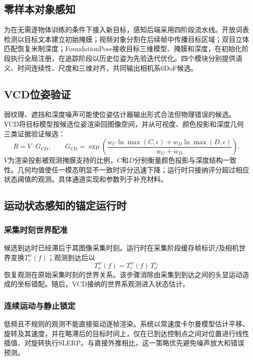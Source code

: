 \documentclass[10pt,journal,compsoc]{IEEEtran}
\begin{document}
\subsection{零样本对象感知}
为在无需逐物体训练的条件下接入新目标，感知后端采用四阶段流水线。开放词表检测以目标文本建立初始掩膜；视频对象分割在后续帧中传播目标区域；双目立体匹配恢复米制深度；FoundationPose接收目标三维模型、掩膜和深度，在初始化阶段执行全局注册，在追踪阶段以历史位姿为先验迭代优化。四个模块分别提供语义、时间连续性、尺度和三维对齐，共同输出相机系6DoF候选。

\subsection{VCD位姿验证}
弱纹理、遮挡和深度噪声可能使位姿估计器输出形式合法但物理错误的候选。VCD将目标模型按候选位姿渲染回图像空间，并从可视度、颜色投影和深度几何三类证据验证候选：
\begin{equation}
R=V\cdot G_{\mathrm{CD}},\qquad
G_{\mathrm{CD}}=\exp\!\left(\frac{w_C\ln\max(C,\epsilon)+w_D\ln\max(D,\epsilon)}{w_C+w_D}\right).
\end{equation}
$V$为渲染投影被观测掩膜支持的比例，$C$和$D$分别衡量颜色投影与深度结构一致性。几何均值使任一模态明显不一致时评分迅速下降；运行时只接纳评分超过相应状态阈值的观测。具体通道实现和参数列于补充材料。

\subsection{运动状态感知的锚定运行时}
\subsubsection{采集时刻世界配准}
候选到达时已经滞后于其图像采集时刻。运行时在采集阶段缓存帧标识$f$及相机世界变换$T_c^w(f)$；观测到达后以
\begin{equation}
T_o^w(f)=T_c^w(f)\,T_o^{c_f}
\label{eq:world}
\end{equation}
恢复观测在原始采集时刻的世界关系。该步骤消除由采集到到达之间的头显运动造成的坐标错配。随后，VCD接纳的世界系观测进入状态估计。

\subsubsection{连续运动与静止锁定}
低频且不规则的观测不能直接驱动逐帧渲染。系统以常速度卡尔曼模型估计平移、旋转及其速度，并在略滞后的目标时间上，仅在已到达控制点之间对位置进行线性插值、对旋转执行SLERP。与直接外推相比，这一策略优先避免噪声放大和错误预测。
\end{document}
